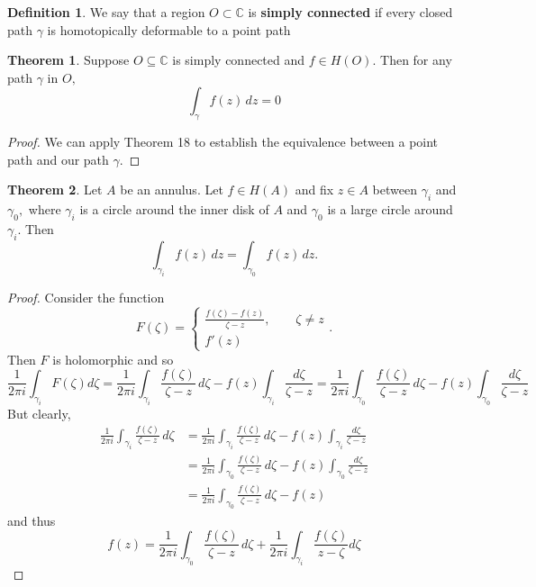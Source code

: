 \documentclass[10pt, oneside]{article}
\newcommand{\bbC}{\mathbb{C}}
\theoremstyle{definition}
\newtheorem{thm}{Theorem}
\newtheorem{defn}{Definition}
\begin{document}
\begin{defn}
    We say that a region $O \subset \bbC$ is \textbf{simply connected} if every closed path $\gamma$ is homotopically  deformable to a point path
\end{defn}

\begin{thm}
    Suppose $O\subseteq \bbC$ is simply connected and $f\in H(O).$ Then for any path $\gamma$ in $O,$ 
    \[\int_\gamma f(z)\, dz = 0\]
\end{thm}
\begin{proof}
    We can apply Theorem 18 to establish the equivalence between a point path and our path $\gamma.$
\end{proof}

\begin{thm}
    Let $A$ be an annulus. Let $f \in H(A)$ and fix $z\in A$ between $\gamma_i$ and $\gamma_0,$ where $\gamma_i$ is a circle around the inner disk of $A$ and $\gamma_0$ is a large circle around $\gamma_i.$ Then 
    \[\int_{\gamma_i}f(z)\, dz = \int_{\gamma_0}f(z)\, dz.\]
\end{thm}
\begin{proof}
    Consider the function 
    \[F(\zeta) = \begin{cases}
        \frac{f(\zeta) - f(z)}{\zeta - z}, \qquad \zeta \neq z\\
        f'(z)
    \end{cases}.\] Then $F$ is holomorphic and so 
    \[\frac{1}{2\pi i}\int_{\gamma_i}F(\zeta)d\zeta = \frac{1}{2\pi i}\int_{\gamma_i}\frac{f(\zeta)}{\zeta - z}\,d\zeta - f(z) \int_{\gamma_i} \frac{d\zeta}{\zeta - z} = \frac{1}{2\pi i}\int_{\gamma_0}\frac{f(\zeta)}{\zeta - z}\,d\zeta - f(z) \int_{\gamma_0} \frac{d\zeta}{\zeta - z}\] But clearly, 
    \begin{align*}
        \frac{1}{2\pi i}\int_{\gamma_i}\frac{f(\zeta)}{\zeta - z}\,d\zeta &= \frac{1}{2\pi i}\int_{\gamma_i}\frac{f(\zeta)}{\zeta - z}\,d\zeta - f(z) \int_{\gamma_i} \frac{d\zeta}{\zeta - z}\\ &= \frac{1}{2\pi i}\int_{\gamma_0}\frac{f(\zeta)}{\zeta - z}\,d\zeta - f(z) \int_{\gamma_0} \frac{d\zeta}{\zeta - z}\\
        &= \frac{1}{2\pi i}\int_{\gamma_0}\frac{f(\zeta)}{\zeta - z}\,d\zeta - f(z) 
    \end{align*} and thus 
    \[f(z) = \frac{1}{2\pi i}\int_{\gamma_0} \frac{f(\zeta)}{\zeta - z}\, d\zeta + \frac{1}{2\pi i}\int_{\gamma_i} \frac{f(\zeta)}{z - \zeta}d\zeta\]
\end{proof}
\end{document}
